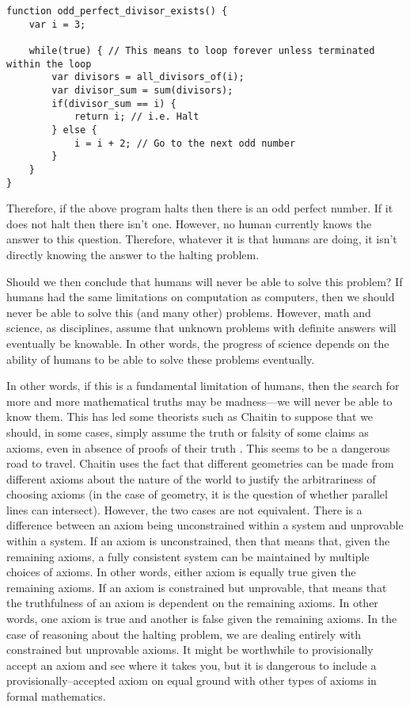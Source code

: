 \begin{verbatim}
function odd_perfect_divisor_exists() {
	var i = 3;

	while(true) { // This means to loop forever unless terminated within the loop
		var divisors = all_divisors_of(i);
		var divisor_sum = sum(divisors);
		if(divisor_sum == i) {
			return i; // i.e. Halt
		} else {
			i = i + 2; // Go to the next odd number
		}
	}
}
\end{verbatim}

Therefore, if the above program halts then there is an odd perfect number.  If it does not halt then there isn't one.  However, no human currently knows the answer to this question.  Therefore, whatever it is that humans are doing, it isn't directly knowing the answer to the halting problem.

Should we then conclude that humans will never be able to solve this problem?  If humans had the same limitations on computation as computers, then we should never be able to solve this (and many other) problems.  However, math and science, as disciplines, assume that unknown problems with definite answers will eventually be knowable.  In other words, the progress of science depends on the ability of humans to be able to solve these problems eventually.

In other words, if this is a fundamental limitation of humans, then the search for more and more mathematical truths may be madness---we will never be able to know them.  This has led some theorists such as Chaitin to suppose that we should, in some cases, simply assume the truth or falsity of some claims as axioms, even in absence of proofs of their truth \citep{chaitin2006}.  This seems to be a dangerous road to travel.  Chaitin uses the fact that different geometries can be made from different axioms about the nature of the world to justify the arbitrariness of choosing axioms (in the case of geometry, it is the question of whether parallel lines can intersect).  However, the two cases are not equivalent.  There is a difference between an axiom being unconstrained within a system and unprovable within a system.  If an axiom is unconstrained, then that means that, given the remaining axioms, a fully consistent system can be maintained by multiple choices of axioms.  In other words, either axiom is equally true given the remaining axioms.  If an axiom is constrained but unprovable, that means that the truthfulness of an axiom is dependent on the remaining axioms.  In other words, one axiom is true and another is false given the remaining axioms.  In the case of reasoning about the halting problem, we are dealing entirely with constrained but unprovable axioms.  It might be worthwhile to provisionally accept an axiom and see where it takes you, but it is dangerous to include a provisionally--accepted axiom on equal ground with other types of axioms in formal mathematics.

